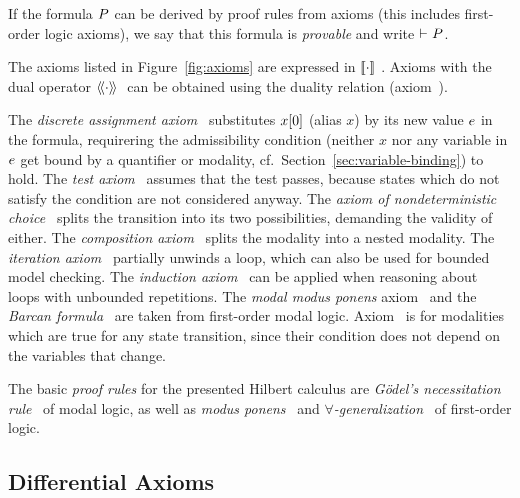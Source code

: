    If the \ddL formula $P$ can be derived by \ddL proof rules from \ddL axioms (this includes first-order logic axioms), we say that this formula is \emph{provable} and write $\vdash_{}P$.

    The axioms listed in Figure~\ref{fig:axioms} are expressed in $\dbox{\cdot}$. Axioms with the dual operator $\ddiamond{\cdot}$ can be obtained using the duality relation (axiom~).

    The \emph{discrete assignment axiom}~ substitutes $x[0]$ (alias $x$) by its new value $e$ in the formula, requirering the admissibility condition (neither $x$ nor any variable in $e$ get bound by a quantifier or modality, cf.~Section~\ref{sec:variable-binding}) to hold.
    The \emph{test axiom}~ assumes that the test passes, because states which do not satisfy the condition are not considered anyway.
    The \emph{axiom of nondeterministic choice}~ splits the transition into its two possibilities, demanding the validity of either.
    The \emph{composition axiom}~ splits the modality into a nested modality.
    The \emph{iteration axiom}~ partially unwinds a loop, which can also be used for bounded model checking.
    The \emph{induction axiom}~
    can be applied when reasoning about loops with unbounded repetitions.
    The \emph{modal modus ponens} axiom~ and the \emph{Barcan formula}~ are taken from first-order modal logic.
    Axiom~ is for modalities which are true for any state transition, since their condition does not depend on the variables that change.

    The basic \emph{proof rules} for the presented Hilbert calculus are \emph{Gödel's necessitation rule}~ of modal logic, as well as \emph{modus ponens}~ and \emph{$\forall$-generalization}~ of first-order logic.


    \subsection{Differential Axioms}
        \label{sec:differential-axioms}

